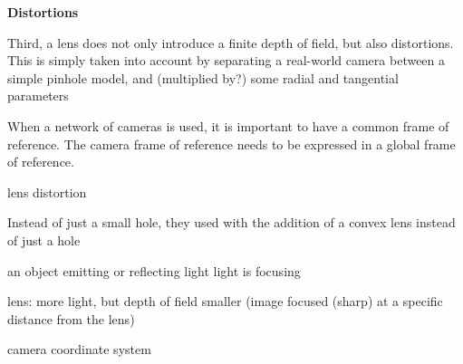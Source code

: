 \noindent\textbf{Distortions}

Third, a lens does not only introduce a finite depth of field, but also distortions. This is simply taken into account by separating a real-world camera between a simple pinhole model, and (multiplied by?) some radial and tangential parameters



When a network of cameras is used, it is important to have a common frame of reference. The camera frame of reference needs to be expressed in a global frame of reference.







lens distortion

Instead of just a small hole, they used  with the addition of a convex lens instead of just a hole

 an object emitting or reflecting light light is focusing

lens: more light, but depth of field smaller (image focused (sharp) at a specific distance from the lens)

camera coordinate system






